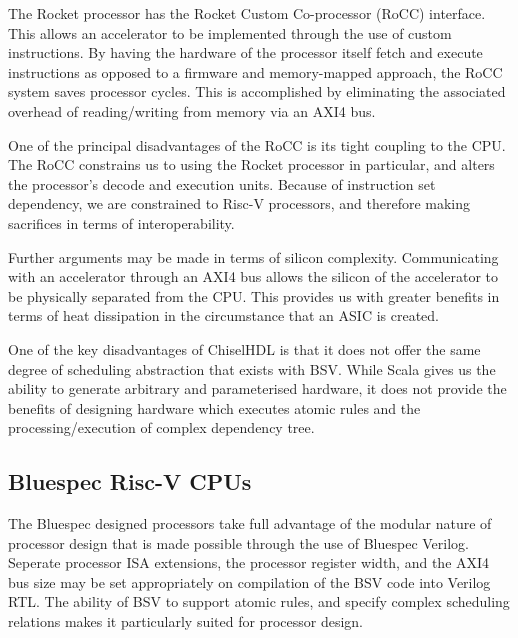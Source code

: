 \documentclass[a4paper,8pt]{report}
\begin{document}

The Rocket processor has the Rocket Custom Co-processor (RoCC) interface. This
allows an accelerator to be implemented through the use of custom instructions.
By having the hardware of the processor itself fetch and execute instructions as
opposed to a firmware and memory-mapped approach, the RoCC system saves
processor cycles. This is accomplished by eliminating the associated overhead of
reading/writing from memory via an AXI4 bus.

One of the principal disadvantages of the RoCC is its tight coupling to the CPU.
The RoCC constrains us to using the Rocket processor in particular, and alters
the processor's decode and execution units. Because of instruction set
dependency, we are constrained to Risc-V processors, and therefore making
sacrifices in terms of interoperability. 

Further arguments may be made in terms of silicon complexity. Communicating with
an accelerator through an AXI4 bus allows the silicon of the accelerator to be
physically separated from the CPU. This provides us with greater benefits in
terms of heat dissipation in the circumstance that an ASIC is created.

One of the key disadvantages of ChiselHDL is that it does not offer the same
degree of scheduling abstraction that exists with BSV. While Scala gives us the
ability to generate arbitrary and parameterised hardware, it does not provide
the benefits of designing hardware which executes atomic rules and the
processing/execution of complex dependency tree.

\subsection{Bluespec Risc-V CPUs}
The Bluespec designed processors take full advantage of the modular nature of
processor design that is made possible through the use of Bluespec Verilog.
Seperate processor ISA extensions, the processor register width, and the AXI4
bus size may be set appropriately on compilation of the BSV code into Verilog
RTL. The ability of BSV to support atomic rules, and specify complex scheduling
relations makes it particularly suited for processor design.
\end{document}
